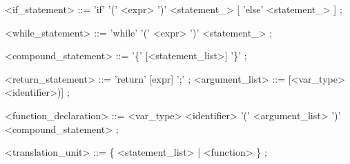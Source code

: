 \documentclass{article}
\begin{document}
\begin{grammar}
<if_statement> ::=
	'if'
       '('
       <expr>
       ')'
       <statement_>
	[
	    'else'
	   <statement_>
	]
    ;

<while_statement> ::=
	'while'
       '('
       <expr>
       ')'
       <statement_>
    ;

<compound_statement> ::=
    '\{' [<statement_list>] '\}'
    ;

<return_statement> ::=
	'return'
    [expr]
       ';'
    ;
<argument_list> ::= [{<var_type> <identifier>)}] ;

<function_declaration> ::=
	<var_type>
       <identifier>
       '(' <argument_list> ')'
       <compound_statement>
    ;

<translation_unit> ::=
    \{ <statement_list> | <function> \} ;
\end{grammar}
\end{document}
